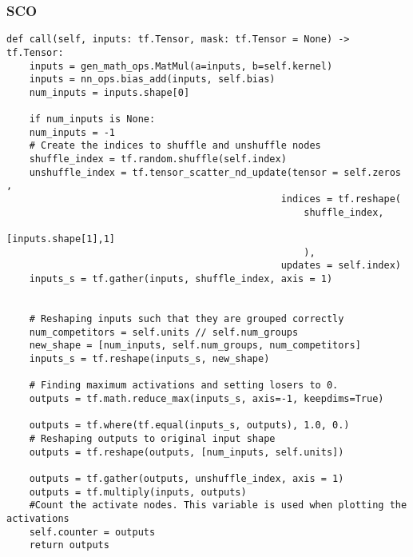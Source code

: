 \subsubsection*{SCO}
\lstset{style=Python}
\begin{lstlisting}[caption={Python implementation for the custom activation function used to define the \ac{SCO} layer.},captionpos=b, label={lst:channel_out}]
def call(self, inputs: tf.Tensor, mask: tf.Tensor = None) -> tf.Tensor:
    inputs = gen_math_ops.MatMul(a=inputs, b=self.kernel)
    inputs = nn_ops.bias_add(inputs, self.bias)
    num_inputs = inputs.shape[0]

    if num_inputs is None:
    num_inputs = -1
    # Create the indices to shuffle and unshuffle nodes
    shuffle_index = tf.random.shuffle(self.index)
    unshuffle_index = tf.tensor_scatter_nd_update(tensor = self.zeros , 
                                                indices = tf.reshape(
                                                    shuffle_index, 
                                                    [inputs.shape[1],1]
                                                    ), 
                                                updates = self.index)
    inputs_s = tf.gather(inputs, shuffle_index, axis = 1)


    # Reshaping inputs such that they are grouped correctly
    num_competitors = self.units // self.num_groups
    new_shape = [num_inputs, self.num_groups, num_competitors]
    inputs_s = tf.reshape(inputs_s, new_shape)

    # Finding maximum activations and setting losers to 0.
    outputs = tf.math.reduce_max(inputs_s, axis=-1, keepdims=True)

    outputs = tf.where(tf.equal(inputs_s, outputs), 1.0, 0.)
    # Reshaping outputs to original input shape
    outputs = tf.reshape(outputs, [num_inputs, self.units])

    outputs = tf.gather(outputs, unshuffle_index, axis = 1) 
    outputs = tf.multiply(inputs, outputs)
    #Count the activate nodes. This variable is used when plotting the activations
    self.counter = outputs
    return outputs 
\end{lstlisting}
\newpage
